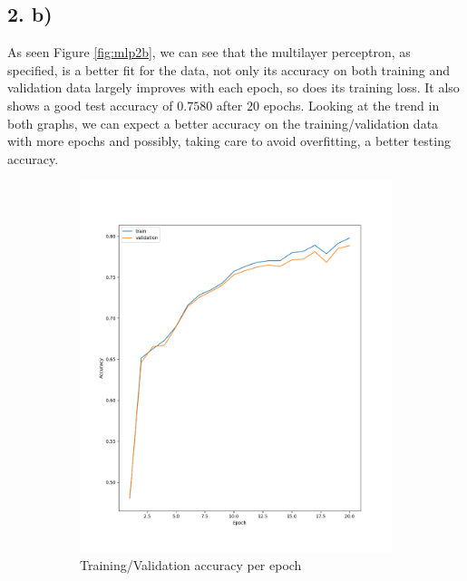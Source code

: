 \documentclass[11pt]{article}
\begin{document}
\subsection{2. b)}
As seen Figure \ref{fig:mlp2b}, we can see that the multilayer perceptron, as specified, is a better fit for the data, not only its accuracy on both training and validation data largely improves with each epoch, so does its training loss. It also shows a good test accuracy of $0.7580$ after $20$ epochs. Looking at the trend in both graphs, we can expect a better accuracy on the training/validation data with more epochs and possibly, taking care to avoid overfitting, a better testing accuracy.
\begin{figure}
\centering
\begin{subfigure}{.5\textwidth}
  \centering
  \includegraphics[width=.9\linewidth]{./plots/mlp_acc_per_epoch.png}
  \caption{Training/Validation accuracy per epoch}
\end{subfigure}%
\begin{subfigure}{.5\textwidth}
  \centering

\end{subfigure}
\end{figure}
\end{document}
